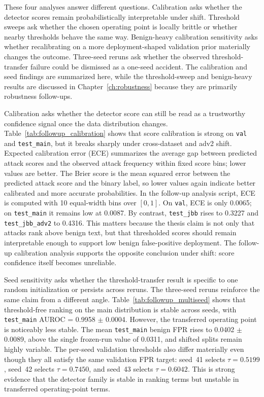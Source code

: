 These four analyses answer different questions. Calibration asks whether the detector scores remain probabilistically interpretable under shift. Threshold sweeps ask whether the chosen operating point is locally brittle or whether nearby thresholds behave the same way. Benign-heavy calibration sensitivity asks whether recalibrating on a more deployment-shaped validation prior materially changes the outcome. Three-seed reruns ask whether the observed threshold-transfer failure could be dismissed as a one-seed accident. The calibration and seed findings are summarized here, while the threshold-sweep and benign-heavy results are discussed in Chapter~\ref{ch:robustness} because they are primarily robustness follow-ups.

Calibration asks whether the detector score can still be read as a trustworthy confidence signal once the data distribution changes. Table~\ref{tab:followup_calibration} shows that score calibration is strong on \texttt{val} and \texttt{test\_main}, but it breaks sharply under cross-dataset and adv2 shift. Expected calibration error (ECE) summarizes the average gap between predicted attack scores and the observed attack frequency within fixed score bins; lower values are better. The Brier score is the mean squared error between the predicted attack score and the binary label, so lower values again indicate better calibrated and more accurate probabilities. In the follow-up analysis script, ECE is computed with 10 equal-width bins over $[0,1]$. On \texttt{val}, ECE is only 0.0065; on \texttt{test\_main} it remains low at 0.0087. By contrast, \texttt{test\_jbb} rises to 0.3227 and \texttt{test\_jbb\_adv2} to 0.4316. This matters because the thesis claim is not only that attacks rank above benign text, but that thresholded scores should remain interpretable enough to support low benign false-positive deployment. The follow-up calibration analysis supports the opposite conclusion under shift: score confidence itself becomes unreliable.



Seed sensitivity asks whether the threshold-transfer result is specific to one random initialization or persists across reruns. The three-seed reruns reinforce the same claim from a different angle. Table~\ref{tab:followup_multiseed} shows that threshold-free ranking on the main distribution is stable across seeds, with \texttt{test\_main} AUROC = 0.9958 $\pm$ 0.0004. However, the transferred operating point is noticeably less stable. The mean \texttt{test\_main} benign FPR rises to 0.0402 $\pm$ 0.0089, above the single frozen-run value of 0.0311, and shifted splits remain highly variable. The per-seed validation thresholds also differ materially even though they all satisfy the same validation FPR target: seed~41 selects $\tau = 0.5199$, seed~42 selects $\tau = 0.7450$, and seed~43 selects $\tau = 0.6042$. This is strong evidence that the detector family is stable in ranking terms but unstable in transferred operating-point terms.

